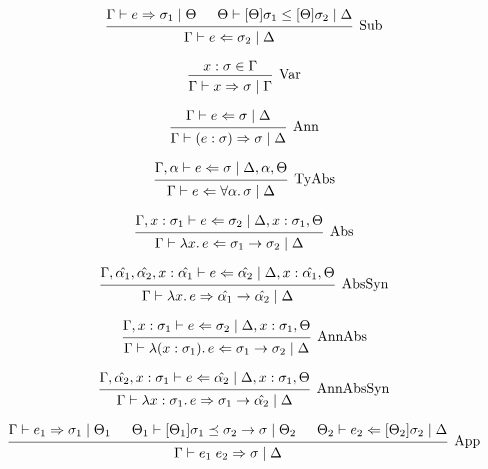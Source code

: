 \documentclass[12pt]{article}
\begin{document}
\pagestyle{empty}

\[
    \begin{prooftree}
        \hypo{\Gamma \vdash e \Rightarrow \sigma_1 \mid \Theta}
        \hypo{\Theta \vdash [\Theta]\sigma_1 \leq [\Theta]\sigma_2 \mid \Delta}
        \infer2[Sub]{\Gamma \vdash e \Leftarrow \sigma_2 \mid \Delta}
    \end{prooftree}
\]

\[
    \begin{prooftree}
        \hypo{x: \sigma \in \Gamma}
        \infer1[Var]{\Gamma \vdash x \Rightarrow \sigma \mid \Gamma}
    \end{prooftree}
\]

\[
    \begin{prooftree}
        \hypo{\Gamma \vdash e \Leftarrow \sigma \mid \Delta}
        \infer1[Ann]{\Gamma \vdash (e: \sigma) \Rightarrow \sigma \mid \Delta}
    \end{prooftree}
\]

\[
    \begin{prooftree}
        \hypo{\Gamma, \alpha \vdash e \Leftarrow \sigma \mid \Delta, \alpha, \Theta}
        \infer1[TyAbs]{\Gamma \vdash e \Leftarrow \forall \alpha\ldotp \sigma \mid \Delta}
    \end{prooftree}
\]

\[
    \begin{prooftree}
        \hypo{\Gamma, x: \sigma_1 \vdash e \Leftarrow \sigma_2 \mid \Delta, x:\sigma_1, \Theta}
        \infer1[Abs]{\Gamma \vdash \lambda x\ldotp e \Leftarrow \sigma_1 \to \sigma_2 \mid \Delta}
    \end{prooftree}
\]

\[
    \begin{prooftree}
        \hypo{\Gamma, \hat{\alpha_1}, \hat{\alpha_2}, x: \hat{\alpha_1} \vdash e \Leftarrow \hat{\alpha_2} \mid \Delta, x: \hat{\alpha_1}, \Theta}
        \infer1[AbsSyn]{\Gamma \vdash \lambda x\ldotp e \Rightarrow \hat{\alpha_1} \to \hat{\alpha_2} \mid \Delta}
    \end{prooftree}
\]

\[
    \begin{prooftree}
        \hypo{\Gamma, x: \sigma_1 \vdash e \Leftarrow \sigma_2 \mid \Delta, x: \sigma_1, \Theta}
        \infer1[AnnAbs]{\Gamma \vdash \lambda (x: \sigma_1)\ldotp e \Leftarrow \sigma_1 \to \sigma_2 \mid \Delta}
    \end{prooftree}
\]

\[
    \begin{prooftree}
        \hypo{\Gamma, \hat{\alpha_2}, x: \sigma_1 \vdash e \Leftarrow \hat{\alpha_2} \mid \Delta, x: \sigma_1, \Theta}
        \infer1[AnnAbsSyn]{\Gamma \vdash \lambda x: \sigma_1\ldotp e \Rightarrow \sigma_1 \to \hat{\alpha_2} \mid \Delta}
    \end{prooftree}
\]

\[
    \begin{prooftree}
        \hypo{\Gamma \vdash e_1 \Rightarrow \sigma_1 \mid \Theta_1}
        \hypo{\Theta_1 \vdash [\Theta_1]\sigma_1 \preceq \sigma_2 \to \sigma \mid \Theta_2}
        \hypo{\Theta_2 \vdash e_2 \Leftarrow [\Theta_2]\sigma_2 \mid \Delta}
        \infer3[App]{\Gamma \vdash e_1\; e_2 \Rightarrow \sigma \mid \Delta}
    \end{prooftree}
\]
\end{document}
